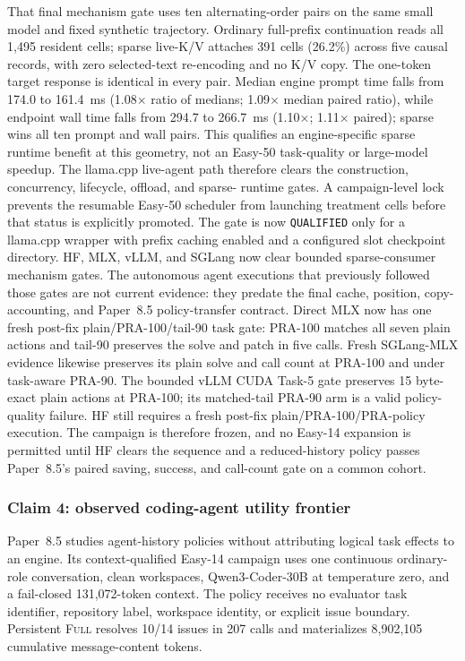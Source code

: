 \documentclass[11pt]{article}
\begin{document}
That final mechanism gate uses ten alternating-order pairs on the same small
model and fixed synthetic trajectory.  Ordinary full-prefix continuation reads
all 1,495 resident cells; sparse live-K/V attaches 391 cells (26.2\%) across
five causal records, with zero selected-text re-encoding and no K/V copy.  The
one-token target response is identical in every pair.  Median engine prompt
time falls from 174.0 to 161.4~ms (1.08$\times$ ratio of medians; 1.09$\times$
median paired ratio), while endpoint wall time falls from 294.7 to 266.7~ms
(1.10$\times$; 1.11$\times$ paired); sparse wins all ten prompt and wall pairs.
This qualifies an engine-specific sparse runtime benefit at this geometry, not
an Easy-50 task-quality or large-model speedup.  The llama.cpp live-agent path
therefore clears the construction, concurrency, lifecycle, offload, and sparse-
runtime gates.  A campaign-level lock prevents the resumable Easy-50 scheduler
from launching treatment cells before that status is explicitly promoted.  The gate is now
\texttt{QUALIFIED} only for a llama.cpp wrapper with prefix caching enabled and
a configured slot checkpoint directory.  HF, MLX, vLLM, and SGLang now clear
bounded sparse-consumer mechanism gates.  The autonomous agent executions that
previously followed those gates are not current evidence: they predate the
final cache, position, copy-accounting, and Paper~8.5 policy-transfer contract.
Direct MLX now has one fresh post-fix plain/PRA-100/tail-90 task gate: PRA-100
matches all seven plain actions and tail-90 preserves the solve and patch in
five calls.  Fresh SGLang-MLX evidence likewise preserves its plain solve and
call count at PRA-100 and under task-aware PRA-90.  The bounded vLLM CUDA
Task-5 gate preserves 15 byte-exact plain actions at PRA-100; its matched-tail
PRA-90 arm is a valid policy-quality failure.  HF still requires a fresh
post-fix plain/PRA-100/PRA-policy execution.  The campaign is therefore frozen,
and no Easy-14 expansion is permitted until HF clears the sequence and a
reduced-history policy passes Paper~8.5's paired saving, success, and call-count
gate on a common cohort.

\subsubsection{Claim 4: observed coding-agent utility frontier}

Paper~8.5 studies agent-history policies without attributing logical task
effects to an engine.  Its context-qualified Easy-14 campaign uses one
continuous ordinary-role conversation, clean workspaces, Qwen3-Coder-30B at
temperature zero, and a fail-closed 131,072-token context.  The policy receives
no evaluator task identifier, repository label, workspace identity, or explicit
issue boundary.  Persistent \textsc{Full} resolves 10/14 issues in 207 calls and
materializes 8,902,105 cumulative message-content tokens.
\end{document}
